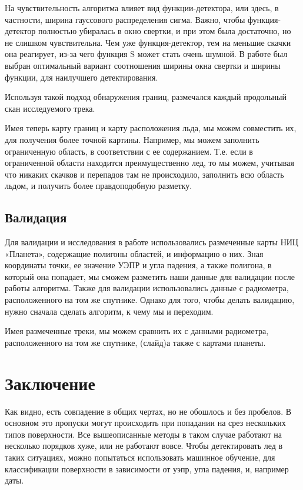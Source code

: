 На чувствительность алгоритма влияет вид функции-детектора, или здесь, в частности, ширина гауссового распределения
сигма. Важно, чтобы функция-детектор полностью убиралась в окно свертки, и при этом была достаточно, но не слишком
чувствительна. Чем уже функция-детектор, тем на меньшие скачки она реагирует, из-за чего функция S может стать очень
шумной. В работе был выбран оптимальный вариант соотношения ширины окна свертки и ширины функции, для наилучшего
детектирования. 

Используя такой подход обнаружения границ, размечался каждый продольный скан исследуемого трека. 

Имея теперь карту границ и карту расположения льда, мы можем совместить их, для получения более точной картины.
Например, мы можем заполнить ограниченную область, в соответствии с ее содержанием. Т.е. если в ограниченной области
находится преимущественно лед, то мы можем, учитывая что никаких скачков и перепадов там не происходило, заполнить всю
область льдом, и получить более правдоподобную разметку.

\subsection{Валидация}
Для валидации и исследования в работе использовались размеченные карты НИЦ «Планета», содержащие полигоны областей, и
информацию о них. Зная координаты точки, ее значение УЭПР и угла падения, а также полигона, в который она попадает, мы
сможем разметить наши данные для валидации после работы алгоритма. Также для валидации использовались данные с
радиометра, расположенного на том же спутнике. Однако для того, чтобы делать валидацию, нужно сначала сделать алгоритм,
к чему мы и переходим.  

Имея размеченные треки, мы можем сравнить их с данными радиометра, расположенного на том же спутнике, (слайд)а также с
картами планеты.

\section{Заключение}
Как видно, есть совпадение в общих чертах, но не обошлось и без пробелов. В основном это пропуски могут происходить при
попадании на срез нескольких типов поверхности. Все вышеописанные методы в таком случае работают на несколько порядков
хуже, или не работают вовсе. Чтобы детектировать лед в таких ситуациях, можно попытаться использовать машинное обучение,
для классификации поверхности в зависимости от уэпр, угла падения, и, например даты.

